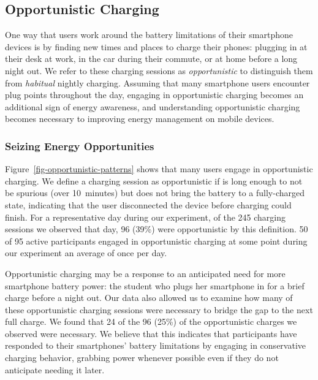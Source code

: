 \subsection{Opportunistic Charging}
\label{subsec-opportunistic}

One way that users work around the battery limitations of their smartphone
devices is by finding new times and places to charge their phones: plugging
in at their desk at work, in the car during their commute, or at home before
a long night out. We refer to these charging sessions as
\textit{opportunistic} to distinguish them from \textit{habitual} nightly
charging. Assuming that many smartphone users encounter plug points
throughout the day, engaging in opportunistic charging becomes an additional
sign of energy awareness, and understanding opportunistic charging becomes
necessary to improving energy management on mobile devices.

\subsubsection{Seizing Energy Opportunities}

Figure~\ref{fig-opportunistic-patterns} shows that many users engage in
opportunistic charging. We define a charging session as opportunistic if is
long enough to not be spurious (over 10~minutes) but does not bring the
battery to a fully-charged state, indicating that the user disconnected the
device before charging could finish. For a representative day during our
experiment, of the 245 charging sessions we observed that day, 96 (39\%) were
opportunistic by this definition. 50 of 95 active participants engaged in
opportunistic charging at some point during our experiment an average of once
per day.

Opportunistic charging may be a response to an anticipated need for more
smartphone battery power: the student who plugs her smartphone in for a brief
charge before a night out. Our data also allowed us to examine how many of
these opportunistic charging sessions were necessary to bridge the gap to the
next full charge. We found that 24 of the 96 (25\%) of the opportunistic
charges we observed were necessary. We believe that this indicates that
participants have responded to their smartphones' battery limitations by
engaging in conservative charging behavior, grabbing power whenever possible
even if they do not anticipate needing it later.

